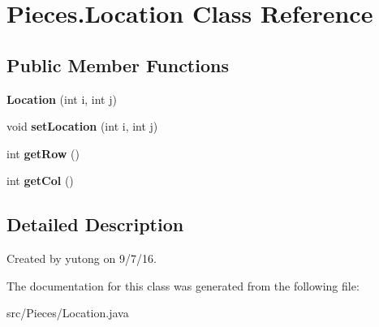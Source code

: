 \hypertarget{classPieces_1_1Location}{\section{Pieces.\-Location Class Reference}
\label{classPieces_1_1Location}
}
\subsection*{Public Member Functions}
\begin{DoxyCompactItemize}
\item 
\hypertarget{classPieces_1_1Location_ad9d31ac2f03a07e98564d9318a576d7f}{{\bfseries Location} (int i, int j)}\label{classPieces_1_1Location_ad9d31ac2f03a07e98564d9318a576d7f}

\item 
\hypertarget{classPieces_1_1Location_aefc53c72a508b41d95f6f044df938161}{void {\bfseries set\-Location} (int i, int j)}\label{classPieces_1_1Location_aefc53c72a508b41d95f6f044df938161}

\item 
\hypertarget{classPieces_1_1Location_a5fa98ec99a45bcd20f7f3d3120ea3d4a}{int {\bfseries get\-Row} ()}\label{classPieces_1_1Location_a5fa98ec99a45bcd20f7f3d3120ea3d4a}

\item 
\hypertarget{classPieces_1_1Location_a3d8a453b994f35c7a14952f6dafede6c}{int {\bfseries get\-Col} ()}\label{classPieces_1_1Location_a3d8a453b994f35c7a14952f6dafede6c}

\end{DoxyCompactItemize}


\subsection{Detailed Description}
Created by yutong on 9/7/16. 

The documentation for this class was generated from the following file\-:\begin{DoxyCompactItemize}
\item 
src/\-Pieces/Location.\-java\end{DoxyCompactItemize}
